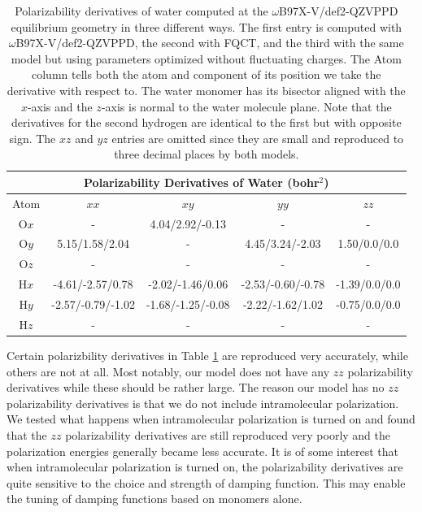\documentclass[journal=jacsat,manuscript=article]{achemso}
\begin{document}
\begin{table}[ht!]
  \begin{center}
  \begin{tabular}{ccccc}
      \multicolumn{5}{c}{Polarizability Derivatives of Water (bohr$^2$)} \\\hline
       Atom & $xx$ & $xy$ & $yy$ & $zz$ \\\hline
       O$x$ & -                 & 4.04/2.92/-0.13    & -                  & -  \\
       O$y$ & 5.15/1.58/2.04    & -                  & 4.45/3.24/-2.03    & 1.50/0.0/0.0  \\
       O$z$ & -                 & -                  & -                  & -  \\
       H$x$ & -4.61/-2.57/0.78  & -2.02/-1.46/0.06   & -2.53/-0.60/-0.78  & -1.39/0.0/0.0  \\
       H$y$ & -2.57/-0.79/-1.02 & -1.68/-1.25/-0.08  & -2.22/-1.62/1.02   & -0.75/0.0/0.0  \\
       H$z$ & -                 & -                  & -                  & -  \\\hline

  \end{tabular}
  \end{center}
  \vspace{-3mm}
  \caption{Polarizability derivatives of water computed at the $\omega$B97X-V/def2-QZVPPD equilibrium geometry
  in three different ways. The first entry is computed with $\omega$B97X-V/def2-QZVPPD, the second with FQCT,
  and the third with the same model but using parameters optimized without fluctuating charges.
  The Atom column tells both the atom and component
  of its position we take the derivative with respect to.
  The water monomer has its bisector aligned with the $x$-axis and the $z$-axis is normal to the water 
  molecule plane. Note that the derivatives for the second hydrogen are identical to the first
  but with opposite sign. The $xz$ and $yz$ entries are omitted since they are small and
  reproduced to three decimal places by both models.}
  \label{tab:pol_derivs}
\end{table}

Certain polarizbility derivatives in Table \ref{tab:pol_derivs} are reproduced very accurately,
while others are not at all. Most notably, our model does not have any $zz$ polarizability derivatives
while these should be rather large. The reason our model has no $zz$ polarizability derivatives
is that we do not include intramolecular polarization. We tested what happens when intramolecular
polarization is turned on and found that the $zz$ polarizability derivatives are still reproduced
very poorly and the polarization energies generally became less accurate. It is of some interest that
when intramolecular polarization is turned on, the polarizability derivatives are quite sensitive
to the choice and strength of damping function. This may enable the tuning of damping functions
based on monomers alone.
\end{document}
